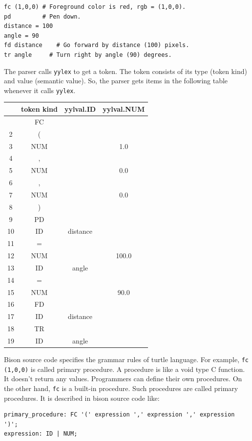 \begin{lstlisting}
fc (1,0,0) # Foreground color is red, rgb = (1,0,0).
pd         # Pen down.
distance = 100
angle = 90
fd distance    # Go forward by distance (100) pixels.
tr angle     # Turn right by angle (90) degrees.
\end{lstlisting}

The parser calls \passthrough{\lstinline!yylex!} to get a token. The
token consists of its type (token kind) and value (semantic value). So,
the parser gets items in the following table whenever it calls
\passthrough{\lstinline!yylex!}.

\begin{longtable}[]{@{}cccc@{}}
\toprule\noalign{}
& token kind & yylval.ID & yylval.NUM \\
\midrule\noalign{}
\endhead
\bottomrule\noalign{}
\endlastfoot
1 & FC & & \\
2 & ( & & \\
3 & NUM & & 1.0 \\
4 & , & & \\
5 & NUM & & 0.0 \\
6 & , & & \\
7 & NUM & & 0.0 \\
8 & ) & & \\
9 & PD & & \\
10 & ID & distance & \\
11 & = & & \\
12 & NUM & & 100.0 \\
13 & ID & angle & \\
14 & = & & \\
15 & NUM & & 90.0 \\
16 & FD & & \\
17 & ID & distance & \\
18 & TR & & \\
19 & ID & angle & \\
\end{longtable}

Bison source code specifies the grammar rules of turtle language. For
example, \passthrough{\lstinline!fc (1,0,0)!} is called primary
procedure. A procedure is like a void type C function. It doesn't return
any values. Programmers can define their own procedures. On the other
hand, \passthrough{\lstinline!fc!} is a built-in procedure. Such
procedures are called primary procedures. It is described in bison
source code like:

\begin{lstlisting}
primary_procedure: FC '(' expression ',' expression ',' expression ')';
expression: ID | NUM;
\end{lstlisting}

